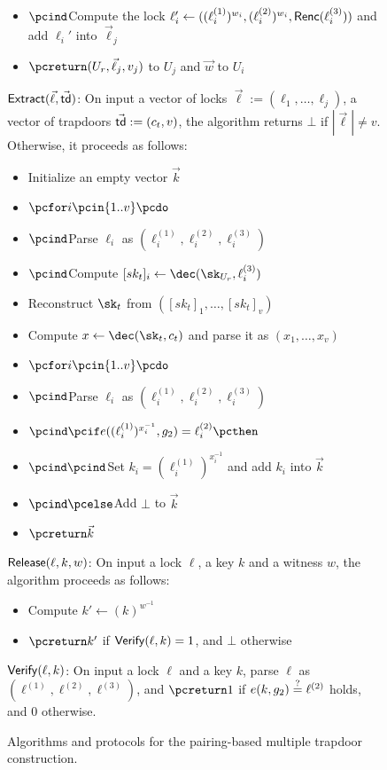 \begin{figure*}[htb]
\begin{center}
{\begin{minipage}[t]{0.75\textwidth}
\begin{itemize}[label=-]
				$(\ell_i^{(1)},\ell_i^{(2)},\ell_i^{(3)})$
				\item $\pcind$Compute the lock $\ell_i' \gets((\ell_i^{(1)})^{w_i},
				(\ell_i^{(2)})^{w_i},\mathsf{Renc}(\ell_i^{(3)}))$ and add $\ell_i'$ into $\vec{\ell}_j$
				\item $\pcreturn (U_r,\vec{\ell}_j,v_j)$ to $U_j$ and $\vec{w}$ to $U_i$
			\end{itemize}
			\underline{$\mathsf{Extract}(\vec{\ell}, \vec{\mathsf{td}})$}: On input a vector of locks 
			$\vec{\ell} := (\ell_1,\ldots,\ell_j)$, a vector of trapdoors $\vec{\mathsf{td}} := (c_t,v)$, 
			the algorithm returns $\bot$ if $|\vec{\ell}| \neq v$. Otherwise, it proceeds as 
			follows:
			\begin{itemize}[label=-]
				\item Initialize an empty vector $\vec{k}$
				\item $\pcfor i \pcin \{1..v\} \pcdo$
				\item $\pcind$Parse $\ell_i$ as $(\ell_i^{(1)},\ell_i^{(2)},\ell_i^{(3)})$
				\item $\pcind$Compute $[sk_t]_i \gets \dec(\sk_{U_r},\ell_i^{(3)})$
				\item Reconstruct $\sk_t$ from $([sk_t]_1,\ldots,[sk_t]_v)$
				\item Compute $x \gets \dec(\sk_t,c_t)$ and parse it as $(x_1,\ldots,x_v)$
				\item $\pcfor i \pcin \{1..v\} \pcdo$
				\item $\pcind$Parse $\ell_i$ as $(\ell_i^{(1)},\ell_i^{(2)},\ell_i^{(3)})$
				\item $\pcind \pcif e((\ell_i^{(1)})^{x_i^{-1}}, g_2) = \ell_i^{(2)} \pcthen$
				\item $\pcind \pcind$Set $k_i = (\ell_i^{(1)})^{x_i^{-1}}$ and add $k_i$ into 
				$\vec{k}$
				\item $\pcind \pcelse$Add $\bot$ to $\vec{k}$
				\item $\pcreturn \vec{k}$
			\end{itemize}
			\underline{$\mathsf{Release}(\ell, k, w)$}: On input a lock $\ell$, a key $k$ and 
			a witness $w$, the algorithm proceeds as follows:
			\begin{itemize}[label=-]
				\item Compute $k' \gets (k)^{w^{-1}}$
				\item $\pcreturn k'$ if $\mathsf{Verify}(\ell, k) = 1$, and $\bot$ otherwise
			\end{itemize}
			\underline{$\mathsf{Verify}(\ell, k)$}: On input a lock $\ell$ and a key $k$, 
			parse $\ell$ as $(\ell^{(1)},\ell^{(2)}, \ell^{(3)})$, and $\pcreturn 1$ if $e(k, g_2) \stackrel{?}{=} 
			\ell^{(2)}$ holds, and 0 otherwise.
		\end{minipage}
	}
	\end{center}
	
	\caption{Algorithms and protocols for the pairing-based multiple trapdoor construction.}
	\label{fig:single-trapdoor}
\end{figure*}

